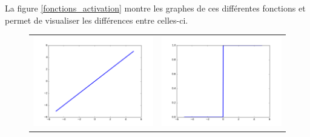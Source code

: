 \documentclass{report}
\begin{document}
La figure \ref{fonctions_activation} montre les graphes de ces différentes fonctions et permet de visualiser les différences entre celles-ci.

\begin{figure}
\begin{center}
\begin{tabular}{cc}
\includegraphics[scale=0.25]{images/id.png} & \includegraphics[scale=0.25]{images/u.png} \\

\end{tabular}
\end{center}
\end{figure}
\end{document}
